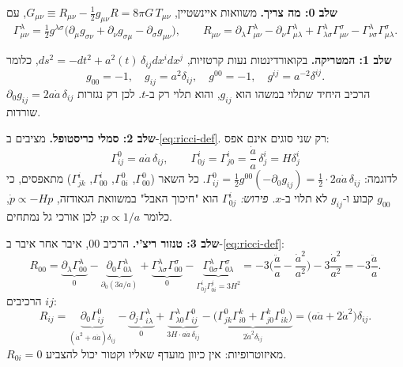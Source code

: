 \textbf{שלב 0: מה צריך.} משוואות איינשטיין, $G_{\mu\nu}\equiv R_{\mu\nu}-\tfrac12g_{\mu\nu}R=8\pi G\,T_{\mu\nu}$, עם
\begin{equation}
\Gamma^\lambda_{\mu\nu}=\tfrac12g^{\lambda\sigma}\big(\partial_\mu g_{\sigma\nu}+\partial_\nu g_{\sigma\mu}-\partial_\sigma g_{\mu\nu}\big),\qquad
R_{\mu\nu}=\partial_\lambda\Gamma^\lambda_{\mu\nu}-\partial_\nu\Gamma^\lambda_{\mu\lambda}+\Gamma^\lambda_{\lambda\sigma}\Gamma^\sigma_{\mu\nu}-\Gamma^\lambda_{\nu\sigma}\Gamma^\sigma_{\mu\lambda}.
\label{eq:ricci-def}
\end{equation}

\textbf{שלב 1: המטריקה.} בקואורדינטות נעות קרטזיות, $ds^2=-dt^2+a^2(t)\,\delta_{ij}dx^idx^j$, כלומר
\begin{equation}
g_{00}=-1,\quad g_{ij}=a^2\delta_{ij},\quad g^{00}=-1,\quad g^{ij}=a^{-2}\delta^{ij}.
\end{equation}
הרכיב היחיד שתלוי במשהו הוא $g_{ij}$, והוא תלוי רק ב-$t$. לכן רק נגזרות $\partial_0g_{ij}=2a\dot a\,\delta_{ij}$ שורדות.

\textbf{שלב 2: סמלי כריסטופל.} מציבים ב-\eqref{eq:ricci-def}. רק שני סוגים אינם אפס:
\begin{equation}
\boxed{\;\Gamma^0_{ij}=a\dot a\,\delta_{ij},\qquad \Gamma^i_{0j}=\Gamma^i_{j0}=\frac{\dot a}{a}\,\delta^i_j=H\delta^i_j\;}
\end{equation}
לדוגמה: $\Gamma^0_{ij}=\tfrac12g^{00}(-\partial_0g_{ij})=\tfrac12\cdot2a\dot a\,\delta_{ij}$. כל השאר ($\Gamma^0_{00}$, $\Gamma^0_{0i}$, $\Gamma^i_{00}$, $\Gamma^i_{jk}$) מתאפסים, כי $g_{00}$ קבוע ו-$g_{ij}$ לא תלוי ב-$x$. \emph{פירוש:} $\Gamma^i_{0j}$ הוא "חיכוך האבל" במשוואת הגאודזה, $\dot p\propto-Hp$, כלומר $p\propto1/a$; לכן אורכי גל נמתחים.

\textbf{שלב 3: טנזור ריצ'י.} הרכיב $00$, איבר אחר איבר ב-\eqref{eq:ricci-def}:
\begin{equation}
R_{00}=\underbrace{\partial_\lambda\Gamma^\lambda_{00}}_{0}-\underbrace{\partial_0\Gamma^\lambda_{0\lambda}}_{\partial_0(3\dot a/a)}+\underbrace{\Gamma^\lambda_{\lambda\sigma}\Gamma^\sigma_{00}}_{0}-\underbrace{\Gamma^\lambda_{0\sigma}\Gamma^\sigma_{0\lambda}}_{\Gamma^i_{0j}\Gamma^j_{0i}=3H^2}
=-3\Big(\frac{\ddot a}{a}-\frac{\dot a^2}{a^2}\Big)-3\frac{\dot a^2}{a^2}
=-3\frac{\ddot a}{a}.
\end{equation}
הרכיבים $ij$:
\begin{equation}
R_{ij}=\underbrace{\partial_0\Gamma^0_{ij}}_{(\dot a^2+a\ddot a)\delta_{ij}}-\underbrace{\partial_j\Gamma^\lambda_{i\lambda}}_{0}+\underbrace{\Gamma^\lambda_{\lambda0}\Gamma^0_{ij}}_{3H\cdot a\dot a\,\delta_{ij}}-\underbrace{\big(\Gamma^0_{jk}\Gamma^k_{i0}+\Gamma^k_{j0}\Gamma^0_{ik}\big)}_{2\dot a^2\delta_{ij}}
=\big(a\ddot a+2\dot a^2\big)\delta_{ij}.
\end{equation}
$R_{0i}=0$ מאיזוטרופיות: אין כיוון מועדף שאליו וקטור יכול להצביע.

